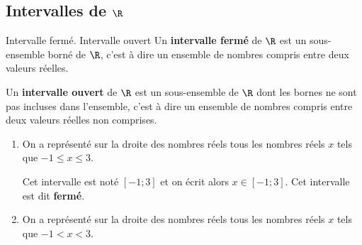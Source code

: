 \begin{pageCours}

\section{Intervalles de $\R$ }

\begin{DefT}{Intervalle fermé. Intervalle ouvert}
Un \textbf{intervalle fermé} de $\R$ est un sous-ensemble borné de $\R$, c'est à dire un ensemble de nombres compris entre deux valeurs réelles.
 
Un \textbf{intervalle ouvert} de $\R$ est un sous-ensemble de $\R$ dont les bornes ne sont pas incluses dans l'ensemble, c'est à dire un ensemble de nombres compris entre deux valeurs réelles non comprises.
\end{DefT}

\begin{Rep}
\begin{enumerate}
\item On a représenté sur la droite des nombres réels tous les nombres réels $x$ tels que $-1 \leq x \leq 3$.

\begin{center}
 \end{center} 
 
Cet intervalle est noté $[-1;3]$ et on écrit alors $x \in [-1;3]$. Cet intervalle est dit \textbf{fermé}.
 \item On a représenté sur la droite des nombres réels tous les nombres réels $x$ tels que $-1 < x < 3$.


\end{enumerate}
\end{Rep}
\end{pageCours}

